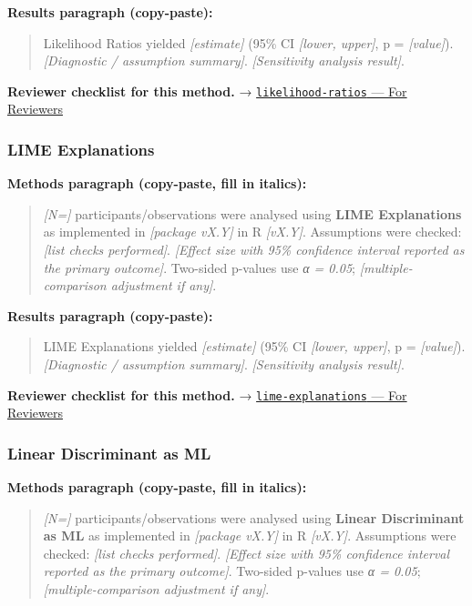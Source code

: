 \documentclass[
]{article}
\begin{document}
\textbf{Results paragraph (copy-paste):}

\begin{quote}
Likelihood Ratios yielded \emph{{[}estimate{]}} (95\% CI \emph{{[}lower,
upper{]}}, p = \emph{{[}value{]}}). \emph{{[}Diagnostic / assumption
summary{]}}. \emph{{[}Sensitivity analysis result{]}}.
\end{quote}

\textbf{Reviewer checklist for this method.} →
\href{../chapters/14-clinical/likelihood-ratios.Rmd\#for-reviewers}{\texttt{likelihood-ratios}
--- For Reviewers}

\subsubsection{LIME Explanations}\label{lime-explanations}

\textbf{Methods paragraph (copy-paste, fill in italics):}

\begin{quote}
\emph{{[}N={]}} participants/observations were analysed using
\textbf{LIME Explanations} as implemented in \emph{{[}package vX.Y{]}}
in R \emph{{[}vX.Y{]}}. Assumptions were checked: \emph{{[}list checks
performed{]}}. \emph{{[}Effect size with 95\% confidence interval
reported as the primary outcome{]}}. Two-sided p-values use \emph{α =
0.05}; \emph{{[}multiple-comparison adjustment if any{]}}.
\end{quote}

\textbf{Results paragraph (copy-paste):}

\begin{quote}
LIME Explanations yielded \emph{{[}estimate{]}} (95\% CI \emph{{[}lower,
upper{]}}, p = \emph{{[}value{]}}). \emph{{[}Diagnostic / assumption
summary{]}}. \emph{{[}Sensitivity analysis result{]}}.
\end{quote}

\textbf{Reviewer checklist for this method.} →
\href{../chapters/13-ml/lime-explanations.Rmd\#for-reviewers}{\texttt{lime-explanations}
--- For Reviewers}

\subsubsection{Linear Discriminant as
ML}\label{linear-discriminant-as-ml}

\textbf{Methods paragraph (copy-paste, fill in italics):}

\begin{quote}
\emph{{[}N={]}} participants/observations were analysed using
\textbf{Linear Discriminant as ML} as implemented in \emph{{[}package
vX.Y{]}} in R \emph{{[}vX.Y{]}}. Assumptions were checked: \emph{{[}list
checks performed{]}}. \emph{{[}Effect size with 95\% confidence interval
reported as the primary outcome{]}}. Two-sided p-values use \emph{α =
0.05}; \emph{{[}multiple-comparison adjustment if any{]}}.
\end{quote}
\end{document}
